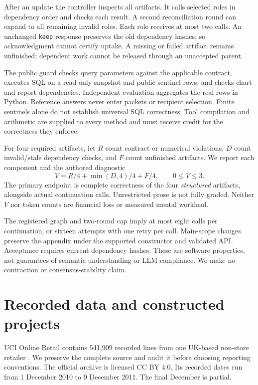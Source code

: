 \documentclass[10pt]{article}
\begin{document}
After an update the controller inspects all artifacts. It calls selected roles in dependency order and checks each result. A second reconciliation round can expand to all remaining invalid roles. Each role receives at most two calls. An unchanged \texttt{keep} response preserves the old dependency hashes, so acknowledgment cannot certify uptake. A missing or failed artifact remains unfinished; dependent work cannot be released through an unaccepted parent.

The public guard checks query parameters against the applicable contract, executes SQL on a read-only snapshot and public sentinel rows, and checks chart and report dependencies. Independent evaluation aggregates the real rows in Python. Reference answers never enter packets or recipient selection. Finite sentinels alone do not establish universal SQL correctness. Tool compilation and arithmetic are supplied to every method and must receive credit for the correctness they enforce.

For four required artifacts, let $R$ count contract or numerical violations, $D$ count invalid/stale dependency checks, and $F$ count unfinished artifacts. We report each component and the authored diagnostic
\[
V = R/4 + \min(D,4)/4 + F/4, \qquad 0 \le V \le 3.
\]
The primary endpoint is complete correctness of the four \emph{structured} artifacts, alongside actual continuation calls. Unrestricted prose is not fully graded. Neither $V$ nor token counts are financial loss or measured mental workload.

The registered graph and two-round cap imply at most eight calls per continuation, or sixteen attempts with one retry per call. Main-scope changes preserve the appendix under the supported constructor and validated API. Acceptance requires current dependency hashes. These are software properties, not guarantees of semantic understanding or LLM compliance. We make no contraction or consensus-stability claim.

\section{Recorded data and constructed projects}
UCI Online Retail contains 541,909 recorded lines from one UK-based non-store retailer \citep{chen2015retail}. We preserve the complete source and audit it before choosing reporting conventions. The official archive is licensed CC BY 4.0. Its recorded dates run from 1 December 2010 to 9 December 2011. The final December is partial.
\end{document}

